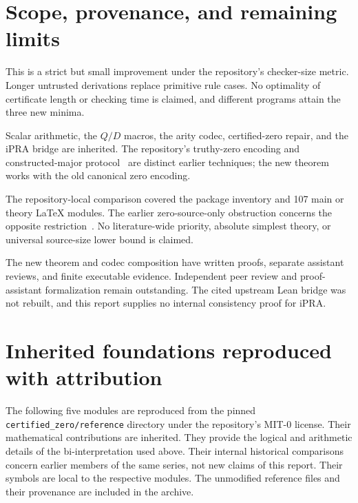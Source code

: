 \documentclass[11pt]{article}
\theoremstyle{definition}\newtheorem{definition}[theorem]{Definition}
\theoremstyle{remark}\newtheorem{remark}[theorem]{Remark}
\newcommand{\file}[1]{\texttt{#1}}
\begin{document}
\section{Scope, provenance, and remaining limits}

This is a strict but small improvement under the repository's checker-size
metric. Longer untrusted derivations replace primitive rule cases. No
optimality of certificate length or checking time is claimed, and different
programs attain the three new minima.

Scalar arithmetic, the $Q/D$ macros, the arity codec, certified-zero repair,
and the iPRA bridge are inherited. The repository's truthy-zero encoding and
constructed-major protocol~\cite{uniformzero} are distinct earlier techniques;
the new theorem works with the old canonical zero encoding.

The repository-local comparison covered the package inventory and 107 main
or theory LaTeX modules. The earlier zero-source-only obstruction concerns
the opposite restriction~\cite{opposite}. No literature-wide priority,
absolute simplest theory, or universal source-size lower bound is claimed.

The new theorem and codec composition have written proofs, separate
assistant reviews, and finite executable evidence. Independent peer review
and proof-assistant formalization remain outstanding. The cited upstream
Lean bridge was not rebuilt, and this report supplies no internal
consistency proof for iPRA.

\clearpage
\appendix
\section*{Inherited foundations reproduced with attribution}
The following five modules are reproduced from the pinned
\file{certified\_zero/reference} directory under the repository's MIT-0
license. Their mathematical contributions are inherited. They provide the
logical and arithmetic details of the bi-interpretation used above. Their
internal historical comparisons concern earlier members of the same series,
not new claims of this report. Their symbols are local to the respective
modules. The unmodified reference files and their
provenance are included in the archive.






\end{document}
